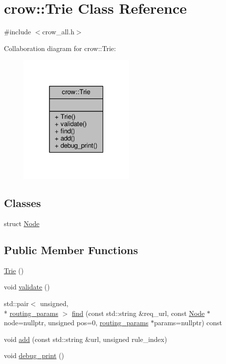 \hypertarget{classcrow_1_1_trie}{\section{crow\-:\-:Trie Class Reference}
\label{classcrow_1_1_trie}
}


{\ttfamily \#include $<$crow\-\_\-all.\-h$>$}



Collaboration diagram for crow\-:\-:Trie\-:
\nopagebreak
\begin{figure}[H]
\begin{center}
\leavevmode
\includegraphics[width=162pt]{classcrow_1_1_trie__coll__graph}
\end{center}
\end{figure}
\subsection*{Classes}
\begin{DoxyCompactItemize}
\item 
struct \hyperlink{structcrow_1_1_trie_1_1_node}{Node}
\end{DoxyCompactItemize}
\subsection*{Public Member Functions}
\begin{DoxyCompactItemize}
\item 
\hyperlink{classcrow_1_1_trie_ae6b070e1e25b6c5d77cfb2aa05473d73}{Trie} ()
\item 
void \hyperlink{classcrow_1_1_trie_a77dcd4729633ce992fc210eeb327dfb5}{validate} ()
\item 
std\-::pair$<$ unsigned, \\*
\hyperlink{structcrow_1_1routing__params}{routing\-\_\-params} $>$ \hyperlink{classcrow_1_1_trie_ab461923f2573933347d27c4d986aeb52}{find} (const std\-::string \&req\-\_\-url, const \hyperlink{structcrow_1_1_trie_1_1_node}{Node} $\ast$node=nullptr, unsigned pos=0, \hyperlink{structcrow_1_1routing__params}{routing\-\_\-params} $\ast$params=nullptr) const 
\item 
void \hyperlink{classcrow_1_1_trie_a2b69bfd87fe489c5169385ca48707971}{add} (const std\-::string \&url, unsigned rule\-\_\-index)
\item 
void \hyperlink{classcrow_1_1_trie_a9ac17b6ae0f96dc94b595bb704a89101}{debug\-\_\-print} ()
\end{DoxyCompactItemize}


